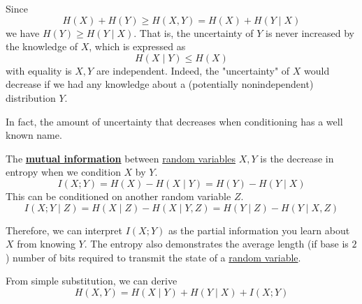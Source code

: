     \begin{theorem}
      \label{thm:conditioning-never-decreases-uncertainty}
      Since 
      \begin{equation}
        H(X) + H(Y) \geq H(X, Y) = H(X) + H(Y \mid X) 
      \end{equation}
      we have $H(Y) \geq H(Y \mid X)$. That is, the uncertainty of $Y$ is never increased by the knowledge of $X$, which is expressed as 
      \begin{equation}
        H(X \mid Y) \leq H(X)
      \end{equation}
      with equality is $X, Y$ are independent. Indeed, the "uncertainty" of $X$ would decrease if we had any knowledge about a (potentially nonindependent) distribution $Y$. 
    \end{theorem}

    In fact, the amount of uncertainty that decreases when conditioning has a well known name. 

    \begin{definition}
      \label{def:mutual-information-2}
      The \textbf{\hyperref[def:mutual-information]{mutual information}} between \hyperref[prob-def:random-variable]{random variables} $X, Y$ is the decrease in entropy when we condition $X$ by $Y$. 
      \begin{equation}
        I(X ; Y) = H(X) - H(X \mid Y) = H(Y) - H(Y \mid X)
      \end{equation}
      This can be conditioned on another random variable $Z$. 
      \begin{equation}
        I(X ; Y \mid Z) = H(X \mid Z) - H(X \mid Y, Z) = H(Y \mid Z) - H(Y \mid X, Z)
      \end{equation}
    \end{definition}
    
    Therefore, we can interpret $I(X; Y)$ as the partial information you learn about $X$ from knowing $Y$. The entropy also demonstrates the average length (if base is $2$) number of bits required to transmit the state of a \hyperref[prob-def:random-variable]{random variable}. 

    \begin{theorem}
      \label{thm:decomposing-the-joint-entropy}
      From simple substitution, we can derive 
      \begin{equation}
        H(X, Y) = H(X \mid Y) + H(Y \mid X) + I(X; Y)
      \end{equation}
    \end{theorem}

